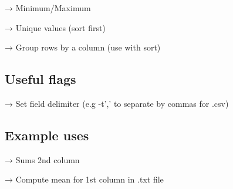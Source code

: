 → Minimum/Maximum

\begin{Shaded}
\begin{Highlighting}[]
\end{Highlighting}
\end{Shaded}

→ Unique values (sort first)

\begin{Shaded}
\begin{Highlighting}[]
\end{Highlighting}
\end{Shaded}

→ Group rows by a column (use with sort)

    \subsection{Useful flags}\label{useful-flags}

\begin{Shaded}
\begin{Highlighting}[]
 \OperatorTok{\textless{}}\OperatorTok{\textgreater{}}
\end{Highlighting}
\end{Shaded}

→ Set field delimiter (e.g -t',' to separate by commas for .csv)

    \subsection{Example uses}\label{example-uses}

\begin{Shaded}
\begin{Highlighting}[]
 \StringTok{\textquotesingle{},\textquotesingle{}}\OperatorTok{\textless{}}
\end{Highlighting}
\end{Shaded}

→ Sums 2nd column

    \begin{Shaded}
\begin{Highlighting}[]
\KeywordTok{|} 
\end{Highlighting}
\end{Shaded}

→ Compute mean for 1st column in .txt file


    
    
    
